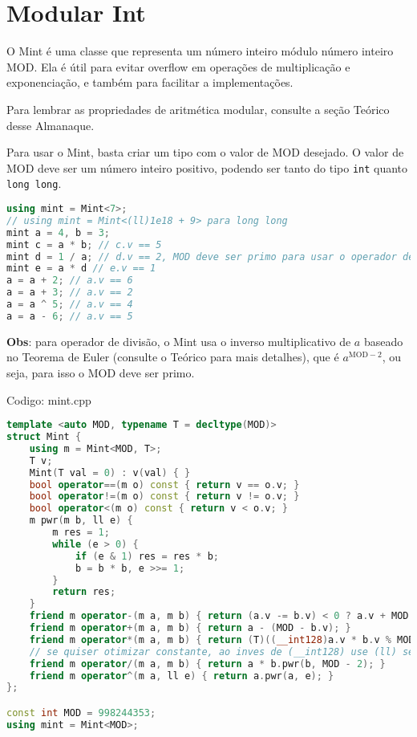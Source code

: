 \documentclass[10pt, a4paper, oneside]{book}
\begin{document}
\section{Modular Int}


O Mint é uma classe que representa um número inteiro módulo número inteiro $\text{MOD}$. Ela é útil para evitar overflow em operações de multiplicação e exponenciação, e também para facilitar a implementações.



Para lembrar as propriedades de aritmética modular, consulte a seção Teórico desse Almanaque.



Para usar o Mint, basta criar um tipo com o valor de $\text{MOD}$ desejado. O valor de $\text{MOD}$ deve ser um número inteiro positivo, podendo ser tanto do tipo \texttt{int} quanto \texttt{long long}.



\begin{lstlisting}[language=C++]
using mint = Mint<7>;
// using mint = Mint<(ll)1e18 + 9> para long long
mint a = 4, b = 3;
mint c = a * b; // c.v == 5
mint d = 1 / a; // d.v == 2, MOD deve ser primo para usar o operador de divisão
mint e = a * d // e.v == 1
a = a + 2; // a.v == 6
a = a + 3; // a.v == 2
a = a ^ 5; // a.v == 4
a = a - 6; // a.v == 5
\end{lstlisting}



\textbf{Obs}: para operador de divisão, o Mint usa o inverso multiplicativo de $a$ baseado no Teorema de Euler (consulte o Teórico para mais detalhes), que é $a^{\text{MOD}-2}$, ou seja, para isso o $\text{MOD}$ deve ser primo.
\hfill

Codigo: mint.cpp

\begin{lstlisting}[language=C++]
template <auto MOD, typename T = decltype(MOD)>
struct Mint {
    using m = Mint<MOD, T>;
    T v;
    Mint(T val = 0) : v(val) { }
    bool operator==(m o) const { return v == o.v; }
    bool operator!=(m o) const { return v != o.v; }
    bool operator<(m o) const { return v < o.v; }
    m pwr(m b, ll e) {
        m res = 1;
        while (e > 0) {
            if (e & 1) res = res * b;
            b = b * b, e >>= 1;
        }
        return res;
    }
    friend m operator-(m a, m b) { return (a.v -= b.v) < 0 ? a.v + MOD : a.v; }
    friend m operator+(m a, m b) { return a - (MOD - b.v); }
    friend m operator*(m a, m b) { return (T)((__int128)a.v * b.v % MOD); }
    // se quiser otimizar constante, ao inves de (__int128) use (ll) se o T for `int`
    friend m operator/(m a, m b) { return a * b.pwr(b, MOD - 2); }
    friend m operator^(m a, ll e) { return a.pwr(a, e); }
};

const int MOD = 998244353;
using mint = Mint<MOD>;\end{lstlisting}
\hfill
\end{document}
